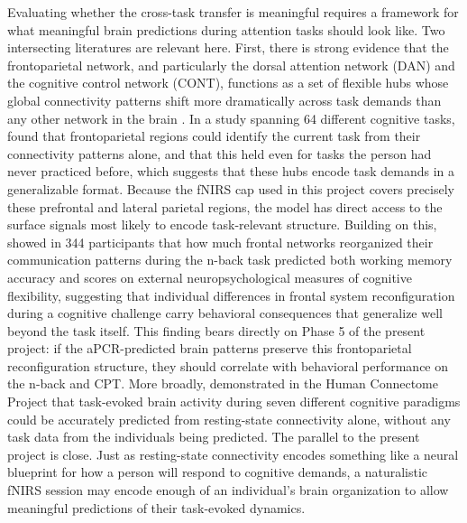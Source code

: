 Evaluating whether the cross-task transfer is meaningful requires a framework for what
meaningful brain predictions during attention tasks should look like. Two intersecting
literatures are relevant here. First, there is strong evidence that the frontoparietal
network, and particularly the dorsal attention network (DAN) and the cognitive control
network (CONT), functions as a set of flexible hubs whose global connectivity patterns
shift more dramatically across task demands than any other network in the brain
\parencite{cole2013}. In a study spanning 64 different cognitive tasks, \textcite{cole2013}
found that frontoparietal regions could identify the current task from their connectivity
patterns alone, and that this held even for tasks the person had never practiced before,
which suggests that these hubs encode task demands in a generalizable format. Because the
fNIRS cap used in this project covers precisely these prefrontal and lateral parietal
regions, the model has direct access to the surface signals most likely to encode
task-relevant structure. Building on this, \textcite{braun2015} showed in 344
participants that how much frontal networks reorganized their communication patterns
during the n-back task predicted both working memory accuracy and scores on external
neuropsychological measures of cognitive flexibility, suggesting that individual
differences in frontal system reconfiguration during a cognitive challenge carry
behavioral consequences that generalize well beyond the task itself. This finding bears
directly on Phase 5 of the present project: if the aPCR-predicted brain patterns
preserve this frontoparietal reconfiguration structure, they should correlate with
behavioral performance on the n-back and CPT. More broadly, \textcite{tavor2016}
demonstrated in the Human Connectome Project that task-evoked brain activity during
seven different cognitive paradigms could be accurately predicted from resting-state
connectivity alone, without any task data from the individuals being predicted. The
parallel to the present project is close. Just as resting-state connectivity encodes
something like a neural blueprint for how a person will respond to cognitive demands,
a naturalistic fNIRS session may encode enough of an individual's brain organization to
allow meaningful predictions of their task-evoked dynamics.

